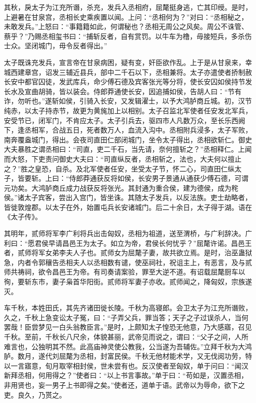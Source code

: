 \documentclass[]{article}
\begin{document}
其秋，戾太子为江充所谮，杀充，发兵入丞相府，屈氂挺身逃，亡其印绶。是时，上避暑在甘泉宫，丞相长史乘疾置以闻。上问：``丞相何为？''对曰：``丞相秘之，未敢发兵。''上怒曰：``事籍籍如此，何谓秘也？丞相无周公之风矣。周公不诛管、蔡乎？''乃赐丞相玺书曰：``捕斩反者，自有赏罚。以牛车为橹，毋接短兵，多杀伤士众。坚闭城门，毋令反者得出。''

太子既诛充发兵，宣言帝在甘泉病困，疑有变，奸臣欲作乱。上于是从甘泉来，幸城西建章宫，诏发三辅近县兵，部中二千石以下，丞相兼将。太子亦遣使者挢制赦长安中都官囚徒，发武库兵，命少傅石德及宾客张光等分将，使长安囚如侯持节发长水及宣曲胡骑，皆以装会。侍郎莽通使长安，因追捕如侯，告胡人曰：``节有诈，勿听也。''遂斩如侯，引骑入长安，又发辑濯士，以予大鸿胪商丘城。初，汉节纯赤，以太子持赤节，故更为黄旄加上以相别。太子召监北军使者任安发北军兵，安受节已，闭军门，不肯应太子。太子引兵去，驱四市人凡数万众，至长乐西阙下，逢丞相军，合战五日，死者数万人，血流入沟中。丞相附兵浸多，太子军败，南奔覆盎城门，得出。会夜司直田仁部闭城门，坐令太子得出，丞相欲斩仁。御史大夫暴胜之谓丞相曰：``司直，吏二千石，当先请，奈何擅斩之？''丞相释仁。上闻而大怒，下吏责问御史大夫曰：``司直纵反者，丞相斩之，法也，大夫何以擅止之？''胜之皇恐，自杀。及北军使者任安，坐受太子节，怀二心，司直田仁纵太子，皆要斩。上曰：``侍郎莽通获反将如侯，长安男子景通从通获少傅石德，可谓元功矣。大鸿胪商丘成力战获反将张光。其封通为重合侯，建为德侯，成为秺侯。''诸太子宾客，尝出入宫门，皆坐诛。其随太子发兵，以反法族。吏士劫略者，皆徙敦煌郡。以太子在外，始置屯兵长安诸城门。后二十余日，太子得于湖。语在《太子传》。

其明年，贰师将军李广利将兵出击匈奴，丞相为祖道，送至渭桥，与广利辞决。广利曰：``愿君侯早请昌邑王为太子。如立为帝，君侯长何忧乎？''屈氂许诺。昌邑王者，贰师将军女弟李夫人子也。贰师女为屈氂子妻，故共欲立焉。是时，治巫蛊狱急，内者令郭穰告丞相夫人以丞相数有谴，使巫祠社，祝诅主上，有恶言，及与贰师共祷祠，欲令昌邑王为帝。有司奏请案验，罪至大逆不道。有诏载屈氂厨车以徇，要斩东市，妻子枭首华阳街。贰师将军妻子亦收。贰师闻之，降匈奴，宗族遂灭。

车千秋，本姓田氏，其先齐诸田徙长陵。千秋为高寝郎。会卫太子为江充所谮败，久之，千秋上急变讼太子冤，曰：``子弄父兵，罪当答；天子之子过误杀人，当何罢哉！臣尝梦见一白头翁教臣言。''是时，上颇知太子惶恐无他意，乃大感寤，召见千秋。至前，千秋长八尺余，体貌甚丽，武帝见而说之，谓曰：``父子之间，人所难言也，公独明其不然。此高庙神灵使公教我，公当遂为吾辅佐。''立拜千秋为大鸿胪。数月，遂代刘屈氂为丞相，封富民侯。千秋无他材能术学，又无伐阅功劳，特以一言寤意，旬月取宰相封侯，世未尝有也。反汉使者至匈奴，单于问曰：``闻汉新拜丞相，何用得之？''使者曰：``以上书言事故。''单于曰：``苟如是，汉置丞相，非用贤也，妄一男子上书即得之矣。''使者还，道单于语。武帝以为辱命，欲下之吏。良久，乃贳之。
\end{document}
